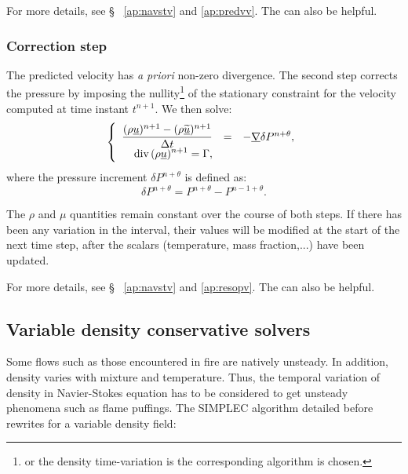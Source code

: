 For more details, see \S~ \ref{ap:navstv} and \ref{ap:predvv}. The  can also be helpful.

\subsubsection{Correction step}
The predicted velocity has \emph{a priori} non-zero divergence. The second step
corrects the pressure by imposing the nullity\footnote{or the density time-variation
is the corresponding algorithm is chosen.}
of the stationary constraint for
the velocity computed at time instant ${t^{n+1}}$.
We then solve:
\begin{equation}\label{eq:timstp:c0_correction_step}
\left\{\begin{array}{ r c l}
\displaystyle \dfrac{(\rho\underline{u})^{n+1}-(\rho\underline{\widetilde{u}})^{n+1}}{\Delta t} &=&
-\underline{\nabla}{\delta P^{n+\theta}} ,\\
\displaystyle
\text{div}\,(\rho\underline{u})^{n+1} = \Gamma ,\\
\end{array}\right.
\end{equation}
where the pressure increment $\delta P^{n+\theta}$ is defined as:
\begin{equation}
\delta P^{n+\theta}=P^{n+\theta}-P^{n-1+\theta} .
\end{equation}

\begin{remark}
The  $\rho$ and $\mu$ quantities remain constant over the course of both
steps. If there has been any variation in the interval, their values will be
modified at the start of the next time step, after the scalars
(temperature, mass fraction,...) have been updated.
\end{remark}


For more details, see \S~ \ref{ap:navstv} and \ref{ap:resopv}. The  can also be helpful.

\subsection{Variable density conservative solvers}

Some flows such as those encountered in fire are natively unsteady.
In addition, density varies with mixture and temperature. Thus, the temporal
variation of density in Navier-Stokes equation has to be considered to get
unsteady phenomena such as flame puffings.
The SIMPLEC algorithm detailed before rewrites for a variable density field:

